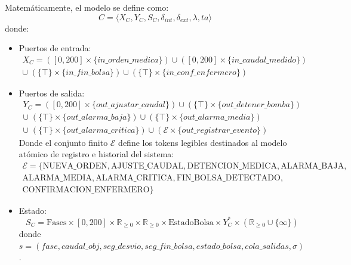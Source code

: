 Matemáticamente, el modelo se define como:
\[ C = \langle X_C, Y_C, S_C, \delta_{int}, \delta_{ext}, \lambda, ta \rangle \]
donde:
\begin{itemize}
\item Puertos de entrada:
    \begin{gather*}
    X_C = ([0, 200] \times \{in\_orden\_medica\}) \cup ([0, 200] \times \{in\_caudal\_medido\}) \\
    \cup\; (\{\top\} \times \{in\_fin\_bolsa\}) \cup (\{\top\} \times \{in\_conf\_enfermero\})
    \end{gather*}

    \item Puertos de salida:
\begin{gather*}
    Y_C = ([0, 200] \times \{out\_ajustar\_caudal\}) \cup (\{\top\} \times \{out\_detener\_bomba\}) \\
    \cup\; (\{\top\} \times \{out\_alarma\_baja\}) \cup (\{\top\} \times \{out\_alarma\_media\}) \\
    \cup\; (\{\top\} \times \{out\_alarma\_critica\}) \cup (\mathcal{E} \times \{out\_registrar\_evento\})
    \end{gather*}
    Donde el conjunto finito $\mathcal{E}$ define los tokens legibles destinados al modelo atómico de registro e historial del sistema:
\begin{gather*}
    \mathcal{E} = \{\text{NUEVA\_ORDEN}, \text{AJUSTE\_CAUDAL}, \text{DETENCION\_MEDICA}, \text{ALARMA\_BAJA}, \\
    \text{ALARMA\_MEDIA}, \text{ALARMA\_CRITICA}, \text{FIN\_BOLSA\_DETECTADO}, \\
    \text{CONFIRMACION\_ENFERMERO}\}
    \end{gather*}

    \item Estado:
    \[ S_C = \text{Fases} \times [0, 200] \times \mathbb{R}_{\geq 0} \times \mathbb{R}_{\geq 0} \times \text{EstadoBolsa} \times Y_C^* \times (\mathbb{R}_{\geq 0} \cup \{\infty\}) \]
    donde $s = (fase, caudal\_obj, seg\_desvio, seg\_fin\_bolsa, estado\_bolsa, cola\_salidas, \sigma)$.


\end{itemize}
